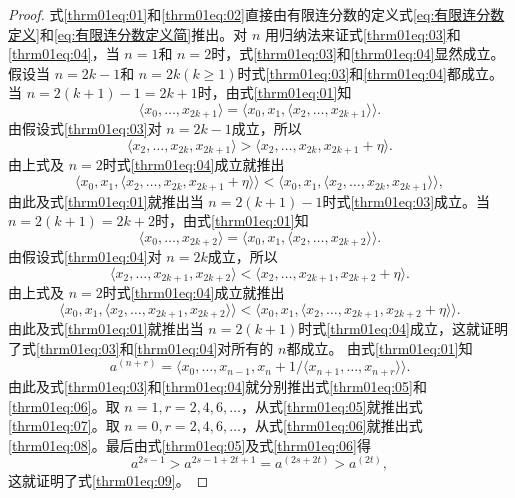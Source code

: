 \begin{proof}
	式\eqref{thrm01eq:01}和\eqref{thrm01eq:02}直接由有限连分数的定义式\eqref{eq:有限连分数定义}和\eqref{eq:有限连分数定义简}推出。对
	\( n \) 用归纳法来证式\eqref{thrm01eq:03}和\eqref{thrm01eq:04}，当 \( n=1 \)和 \( n=2
	\)时，式\eqref{thrm01eq:03}和\eqref{thrm01eq:04}显然成立。假设当 \( n=2k-1 \)和 \( n=2k (k \ge
	1)\)时式\eqref{thrm01eq:03}和\eqref{thrm01eq:04}都成立。当 \( n=2(k+1)-1=2k+1 \)时，由式\eqref{thrm01eq:01}知
	\begin{equation*}
		\langle x_0, \dots, x_{2k+1} \rangle = \langle x_0, x_1, \langle x_2, \dots, x_{2k+1} \rangle\rangle.
	\end{equation*}
	由假设式\eqref{thrm01eq:03}对 \( n = 2k -1 \)成立，所以
	\begin{equation*}
		\langle x_2, \dots, x_{2k}, x_{2k+1} \rangle > \langle x_2, \dots, x_{2k}, x_{2k+1} + \eta \rangle.
	\end{equation*}
	由上式及 \( n=2 \)时式\eqref{thrm01eq:04}成立就推出
	\begin{equation*}
		\langle x_0, x_1, \langle x_2, \dots, x_{2k}, x_{2k+1} + \eta \rangle\rangle < \langle x_0, x_1, \langle
		x_2, \dots, x_{2k}, x_{2k+1} \rangle\rangle,
	\end{equation*}
	由此及式\eqref{thrm01eq:01}就推出当 \( n=2(k+1) - 1 \)时式\eqref{thrm01eq:03}成立。当 \( n=2(k+1) = 2k + 2
	\)时，由式\eqref{thrm01eq:01}知
	\begin{equation*}
		\langle x_0, \dots, x_{2k+2} \rangle = \langle x_0, x_1, \langle x_2, \dots, x_{2k+2}\rangle\rangle.
	\end{equation*}
	由假设式\eqref{thrm01eq:04}对 \( n=2k \)成立，所以
	\begin{equation*}
		\langle x_2, \dots, x_{2k+1}, x_{2k+2} \rangle < \langle x_2, \dots, x_{2k+1}, x_{2k+2} + \eta \rangle.
	\end{equation*}
	由上式及 \( n=2 \)时式\eqref{thrm01eq:04}成立就推出
	\begin{equation*}
		\langle x_0, x_1, \langle x_2, \dots, x_{2k+1}, x_{2k+2} \rangle\rangle < \langle x_0, x_1, \langle x_2,
		\dots, x_{2k+1}, x_{2k+2} + \eta\rangle\rangle.
	\end{equation*}
	由此及式\eqref{thrm01eq:01}就推出当 \( n=2(k+1)
	\)时式\eqref{thrm01eq:04}成立，这就证明了式\eqref{thrm01eq:03}和\eqref{thrm01eq:04}对所有的 \( n \)都成立。
	由式\eqref{thrm01eq:01}知
	\begin{equation*}
		a^{(n+r)} = \langle x_0, \dots, x_{n-1}, x_{n} + 1/\langle x_{n+1}, \dots, x_{n+r}\rangle\rangle.
	\end{equation*}
	由此及式\eqref{thrm01eq:03}和\eqref{thrm01eq:04}就分别推出式\eqref{thrm01eq:05}和\eqref{thrm01eq:06}。取 \( n=1,
	r=2,4,6,\dots \)，从式\eqref{thrm01eq:05}就推出式\eqref{thrm01eq:07}。取 \( n=0, r=2,4,6,\dots
	\)，从式\eqref{thrm01eq:06}就推出式\eqref{thrm01eq:08}。最后由式\eqref{thrm01eq:05}及式\eqref{thrm01eq:06}得
	\begin{equation*}
		a^{2s-1} > a^{2s-1 + 2t + 1} = a^{(2s+2t)}  > a^{(2t)},
	\end{equation*}
	这就证明了式\eqref{thrm01eq:09}。
\end{proof}

